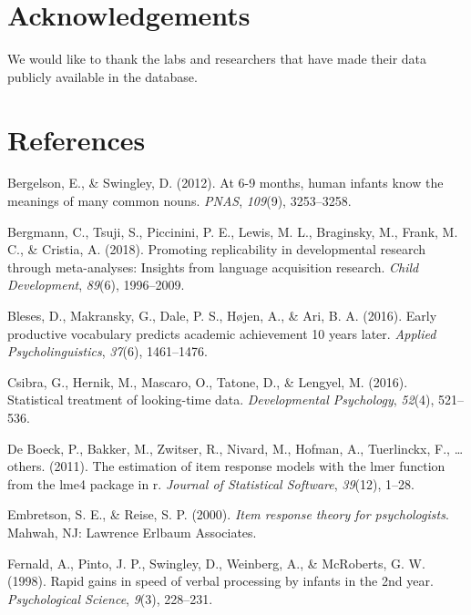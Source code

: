 \documentclass[10pt, letterpaper]{article}
\begin{document}
\hypertarget{acknowledgements}{%
\section{Acknowledgements}\label{acknowledgements}}

We would like to thank the labs and researchers that have made their
data publicly available in the database.

\hypertarget{references}{%
\section{References}\label{references}}

\setlength{\parindent}{-0.1in} 
\setlength{\leftskip}{0.125in}

\noindent

\hypertarget{refs}{}
\leavevmode\hypertarget{ref-Bergelson2012a}{}%
Bergelson, E., \& Swingley, D. (2012). At 6-9 months, human infants know
the meanings of many common nouns. \emph{PNAS}, \emph{109}(9),
3253--3258.

\leavevmode\hypertarget{ref-Bergmann2018}{}%
Bergmann, C., Tsuji, S., Piccinini, P. E., Lewis, M. L., Braginsky, M.,
Frank, M. C., \& Cristia, A. (2018). Promoting replicability in
developmental research through meta-analyses: Insights from language
acquisition research. \emph{Child Development}, \emph{89}(6),
1996--2009.

\leavevmode\hypertarget{ref-Bleses2016}{}%
Bleses, D., Makransky, G., Dale, P. S., Højen, A., \& Ari, B. A. (2016).
Early productive vocabulary predicts academic achievement 10 years
later. \emph{Applied Psycholinguistics}, \emph{37}(6), 1461--1476.

\leavevmode\hypertarget{ref-Csibra2016}{}%
Csibra, G., Hernik, M., Mascaro, O., Tatone, D., \& Lengyel, M. (2016).
Statistical treatment of looking-time data. \emph{Developmental
Psychology}, \emph{52}(4), 521--536.

\leavevmode\hypertarget{ref-de-boeck2011}{}%
De Boeck, P., Bakker, M., Zwitser, R., Nivard, M., Hofman, A.,
Tuerlinckx, F., \ldots{} others. (2011). The estimation of item response
models with the lmer function from the lme4 package in r. \emph{Journal
of Statistical Software}, \emph{39}(12), 1--28.

\leavevmode\hypertarget{ref-embretson2000}{}%
Embretson, S. E., \& Reise, S. P. (2000). \emph{Item response theory for
psychologists}. Mahwah, NJ: Lawrence Erlbaum Associates.

\leavevmode\hypertarget{ref-fernald1998}{}%
Fernald, A., Pinto, J. P., Swingley, D., Weinberg, A., \& McRoberts, G.
W. (1998). Rapid gains in speed of verbal processing by infants in the
2nd year. \emph{Psychological Science}, \emph{9}(3), 228--231.
\end{document}
